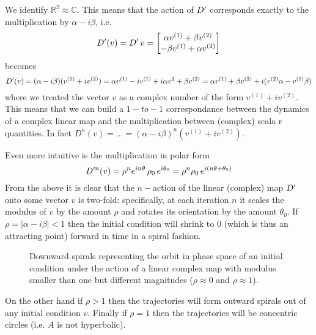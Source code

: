 \documentclass[../main.tex]{subfiles}
\begin{document}
\begin{interpretation*}{}
     We identify $\mathbb{R}^{2}\approx\mathbb{C}$. This means that the action of $D'$ corresponds exactly to the multiplication by $\alpha - i \beta$, i.e. 
     \begin{equation*}
          D'(v) = D'\,v = \begin{bmatrix}
               \alpha v^{(1)} + \beta v^{(2)} \\
               -\beta v^{(1)} + \alpha v^{(2)}
          \end{bmatrix}
     \end{equation*}
     becomes
     \begin{equation*}
         D'(v)=(\alpha - i \beta)(v^{(1)} + i v^{(2)}) = \alpha v^{(1)} - i v^{(1)} + i \alpha v^{2} + \beta v^{(2)} =  \alpha v^{(1)} + \beta v^{(2)} + i(v^{(2)}\alpha - v^{(1)}\beta)
     \end{equation*}
where we treated the vector $v$ as a complex number of the form $v^{(1)}+i v^{(2)}$.
This means that we can build a $1-to-1$ correspondance between the dynamics of a complex linear map and the multiplication between (complex) scala r quantities. In fact $D^{n}(v)=\dots=(\alpha - i \beta)^{n}(v^{(1)}+i v^{(2)})$. 

Even more intuitive is the multiplication in polar form
\begin{equation*}
    D'^{n}(v)=\rho^{n} e^{i n \theta}\,\rho_{0}\,e^{i \theta_{0}}= \rho^{n}\rho_{0}\,e^{i(n\theta + \theta_{0})}
\end{equation*}
From the above it is clear that the $n-$action of the linear (complex) map $D'$ onto some vector $v$ is two-fold: specifically, at each iteration $n$ it scales the modulus of $v$ by the amount $\rho$ and rotates its orientation by the amount $\theta_{0}$. 
If $\rho=|\alpha - i \beta|<1$ then the initial condition will shrink to $0$ (which is thus an attracting point) forward in time in a spiral fashion.
\begin{figure}[H]
    \centering 
    \caption{Downward spirals representing the orbit in phase space of an initial condition under the action of a linear complex map with modulus smaller than one but different magnitudes ($\rho \approx 0$ and $\rho \approx 1$).}
    \label{fig2}
\end{figure}
On the other hand if $\rho>1$ then the trajectories will form outward spirals out of any initial condition $v$.
Finally if $\rho=1$ then the trajectories will be concentric circles (i.e. $A$ is not hyperbolic).


\end{interpretation*}
\end{document}
